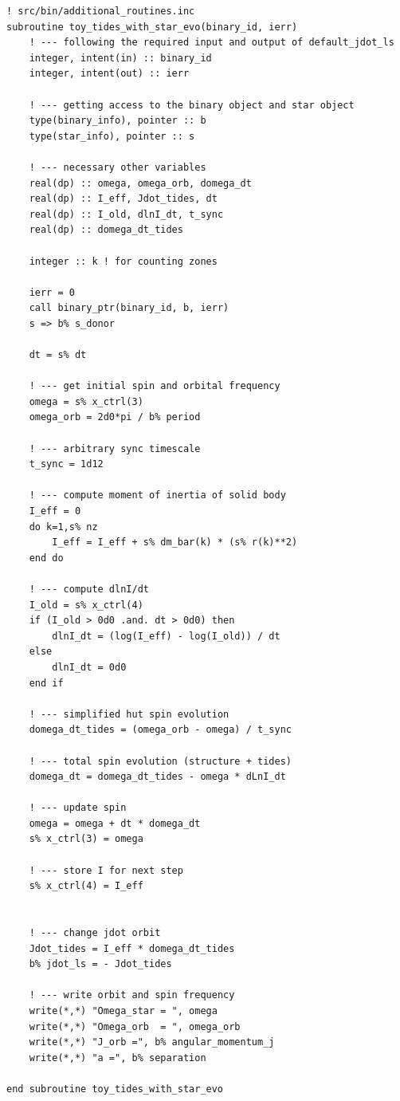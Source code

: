 \documentclass[a4paper,10pt]{article}
\begin{document}
\begin{verbatim}
! src/bin/additional_routines.inc
subroutine toy_tides_with_star_evo(binary_id, ierr)
    ! --- following the required input and output of default_jdot_ls
    integer, intent(in) :: binary_id
    integer, intent(out) :: ierr

    ! --- getting access to the binary object and star object
    type(binary_info), pointer :: b
    type(star_info), pointer :: s

    ! --- necessary other variables
    real(dp) :: omega, omega_orb, domega_dt
    real(dp) :: I_eff, Jdot_tides, dt
    real(dp) :: I_old, dlnI_dt, t_sync
    real(dp) :: domega_dt_tides

    integer :: k ! for counting zones

    ierr = 0
    call binary_ptr(binary_id, b, ierr)
    s => b% s_donor 

    dt = s% dt

    ! --- get initial spin and orbital frequency
    omega = s% x_ctrl(3)
    omega_orb = 2d0*pi / b% period

    ! --- arbitrary sync timescale
    t_sync = 1d12

    ! --- compute moment of inertia of solid body
    I_eff = 0
    do k=1,s% nz
        I_eff = I_eff + s% dm_bar(k) * (s% r(k)**2)
    end do

    ! --- compute dlnI/dt
    I_old = s% x_ctrl(4)
    if (I_old > 0d0 .and. dt > 0d0) then
        dlnI_dt = (log(I_eff) - log(I_old)) / dt
    else
        dlnI_dt = 0d0
    end if

    ! --- simplified hut spin evolution
    domega_dt_tides = (omega_orb - omega) / t_sync

    ! --- total spin evolution (structure + tides)
    domega_dt = domega_dt_tides - omega * dLnI_dt

    ! --- update spin
    omega = omega + dt * domega_dt
    s% x_ctrl(3) = omega 

    ! --- store I for next step
    s% x_ctrl(4) = I_eff


    ! --- change jdot orbit
    Jdot_tides = I_eff * domega_dt_tides
    b% jdot_ls = - Jdot_tides

    ! --- write orbit and spin frequency
    write(*,*) "Omega_star = ", omega 
    write(*,*) "Omega_orb  = ", omega_orb
    write(*,*) "J_orb =", b% angular_momentum_j
    write(*,*) "a =", b% separation

end subroutine toy_tides_with_star_evo
\end{verbatim}
\end{document}
